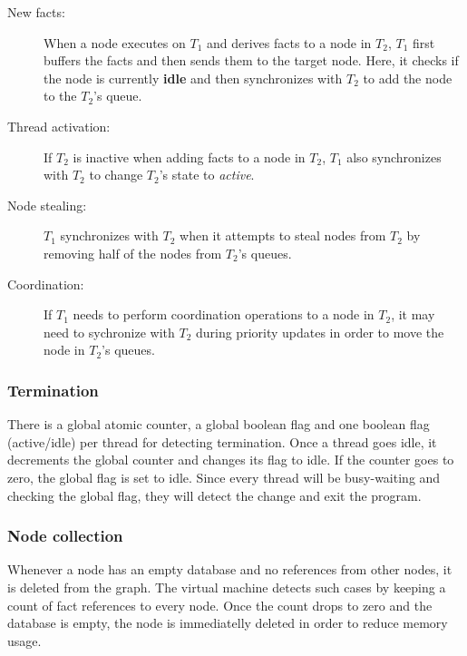 \begin{description}
   \item[New facts:] When a node executes on $T_1$ and derives facts
   to a node in $T_2$, $T_1$ first buffers the facts 
   and then sends them to the target node. Here, it checks if the
   node is currently \textbf{idle} and then synchronizes with $T_2$ to add the
   node to the $T_2$'s queue.
   \item[Thread activation:] If $T_2$ is inactive when adding facts to a node in
   $T_2$, $T_1$ also synchronizes with $T_2$ to change $T_2$'s state to \emph{active}.
   \item[Node stealing:] $T_1$ synchronizes with $T_2$ when it attempts to steal
   nodes from $T_2$ by removing half of the nodes from $T_2$'s queues.
   \item[Coordination:] If $T_1$ needs to perform coordination operations
   to a node in $T_2$, it may need to sychronize with $T_2$ during priority
   updates in order to move the node in $T_2$'s queues.
\end{description}

\subsubsection{Termination}

There is a global atomic counter, a global boolean flag and one boolean flag
(active/idle) per thread for detecting termination. Once a thread goes idle,
it decrements the global counter and changes its flag to idle. If the counter
goes to zero, the global flag is set to idle. Since every thread will be
busy-waiting and checking the global flag, they will detect the change and exit
the program.

\subsubsection{Node collection}

Whenever a node has an empty database and no references from other nodes, it is
deleted from the graph. The virtual machine detects such cases by keeping a
count of fact references to every node. Once the count drops to zero and the
database is empty, the node is immediatelly deleted in order to reduce memory
usage.
